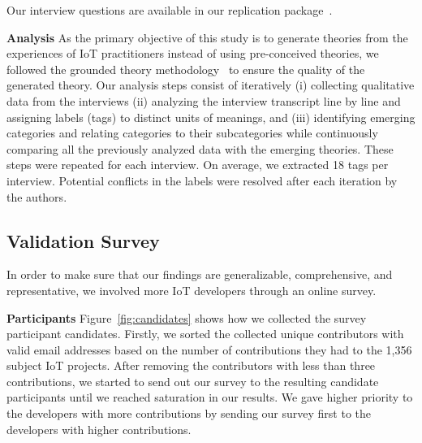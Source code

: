 Our interview questions are available in our replication package~\cite{interviewQs}.

\textbf{Analysis} \label{interviewAnalysis}
As the primary objective of this study is to generate theories from the experiences of IoT practitioners instead of using pre-conceived theories, we followed the grounded theory methodology~\cite{grounded2007} to ensure the quality of the generated theory. Our analysis steps consist of iteratively (i) collecting qualitative data from the interviews (ii)  analyzing the interview transcript line by line and assigning labels (tags) to distinct units of meanings, and (iii) identifying emerging categories and relating categories to their subcategories while continuously comparing all the previously analyzed data with the emerging theories. These steps were repeated for each interview. On average, we extracted 18 tags per interview. Potential conflicts in the labels were resolved after each iteration by the authors. 

\subsection{Validation Survey} \label{survey4bug}
In order to make sure that our findings are generalizable, comprehensive, and representative, we involved more IoT developers through an online survey. 

\textbf{Participants} 
Figure~\autoref{fig:candidates} shows how we collected the survey participant candidates. Firstly, we sorted the collected unique contributors with valid email addresses based on the number of contributions they had to the 1,356 subject IoT projects. After removing the contributors with less than three contributions, we started to send out our survey to the resulting candidate participants until we reached saturation in our results. We gave higher priority to the developers with more contributions by sending our survey first to the developers with higher contributions.

